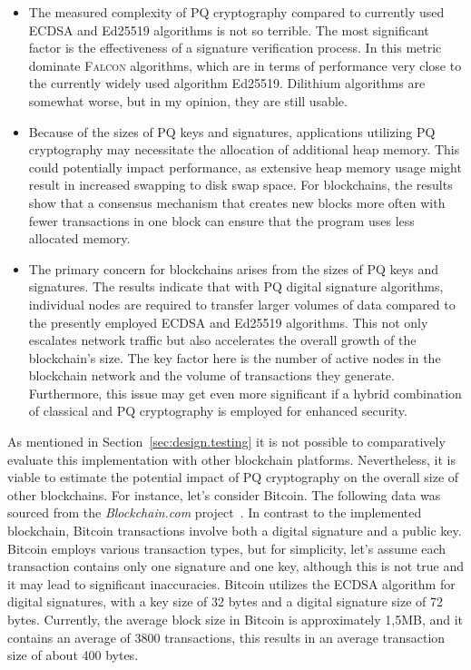 \begin{itemize}
    \item The measured complexity of PQ cryptography compared to currently used ECDSA and Ed25519 algorithms is not so terrible. The most significant factor is the effectiveness of a signature verification process. In this metric dominate \textsc{Falcon} algorithms, which are in terms of performance very close to the currently widely used algorithm Ed25519. Dilithium algorithms are somewhat worse, but in my opinion, they are still usable.
    \item Because of the sizes of PQ keys and signatures, applications utilizing PQ cryptography may necessitate the allocation of additional heap memory. This could potentially impact performance, as extensive heap memory usage might result in increased swapping to disk swap space. For blockchains, the results show that a consensus mechanism that creates new blocks more often with fewer transactions in one block can ensure that the program uses less allocated memory.
    \item The primary concern for blockchains arises from the sizes of PQ keys and signatures. The results indicate that with PQ digital signature algorithms, individual nodes are required to transfer larger volumes of data compared to the presently employed ECDSA and Ed25519 algorithms. This not only escalates network traffic but also accelerates the overall growth of the blockchain's size. The key factor here is the number of active nodes in the blockchain network and the volume of transactions they generate. Furthermore, this issue may get even more significant if a hybrid combination of classical and PQ cryptography is employed for enhanced security.
\end{itemize}

As mentioned in Section~\ref{sec:design.testing} it is not possible to comparatively evaluate this implementation with other blockchain platforms. Nevertheless, it is viable to estimate the potential impact of PQ cryptography on the overall size of other blockchains. For instance, let's consider Bitcoin. The following data was sourced from the \emph{Blockchain.com} project~\cite{bitcoin.com.project}. In contrast to the implemented blockchain, Bitcoin transactions involve both a digital signature and a public key. Bitcoin employs various transaction types, but for simplicity, let's assume each transaction contains only one signature and one key, although this is not true and it may lead to significant inaccuracies. Bitcoin utilizes the ECDSA algorithm for digital signatures, with a key size of 32 bytes and a digital signature size of 72 bytes. Currently, the average block size in Bitcoin is approximately 1,5MB, and it contains an average of 3800 transactions, this results in an average transaction size of about 400 bytes.

